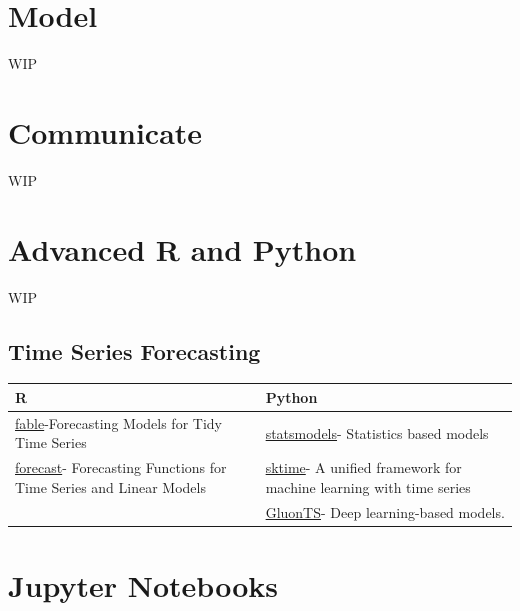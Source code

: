 \documentclass[
]{book}
\begin{document}
\hypertarget{model}{%
\chapter{Model}\label{model}}

WIP

\hypertarget{communicate}{%
\chapter{Communicate}\label{communicate}}

WIP

\hypertarget{advanced-r-and-python}{%
\chapter{Advanced R and Python}\label{advanced-r-and-python}}

WIP

\hypertarget{time-series-forecasting}{%
\section{Time Series Forecasting}\label{time-series-forecasting}}

\begin{longtable}[]{@{}
  >{\raggedright\arraybackslash}p{}
  >{\raggedright\arraybackslash}p{}@{}}
\toprule
R & Python \\
\midrule
\endhead
\href{https://cran.r-project.org/web/packages/fable/index.html}{fable}-Forecasting Models for Tidy Time Series & \href{https://www.statsmodels.org/devel/user-guide.html\#time-series-analysis}{statsmodels}- Statistics based models \\
\href{https://cran.r-project.org/web/packages/forecast/index.html}{forecast}- Forecasting Functions for Time Series and Linear Models & \href{https://www.sktime.org/en/latest/}{sktime}- A unified framework for machine learning with time series \\
\(\text{}\) & \href{https://ts.gluon.ai/}{GluonTS}- Deep learning-based models. \\
\bottomrule
\end{longtable}

\hypertarget{jupyter-notebooks}{%
\chapter{Jupyter Notebooks}\label{jupyter-notebooks}}
\end{document}
